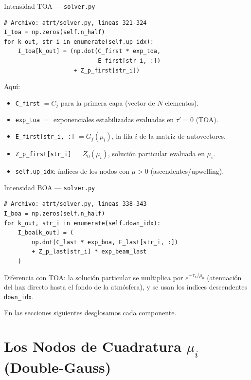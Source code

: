 \documentclass[a4paper,11pt]{article}
\begin{document}
\begin{implementation}{Intensidad TOA --- \texttt{solver.py}}
\begin{lstlisting}
# Archivo: atrt/solver.py, lineas 321-324
I_toa = np.zeros(self.n_half)
for k_out, str_i in enumerate(self.up_idx):
    I_toa[k_out] = (np.dot(C_first * exp_toa,
                           E_first[str_i, :])
                    + Z_p_first[str_i])
\end{lstlisting}
Aqu\'i:
\begin{itemize}
\item \texttt{C\_first} $= \widetilde{C}_j$ para la primera capa (vector de $N$ elementos).
\item \texttt{exp\_toa} $= $ exponenciales estabilizadas evaluadas en $\tau' = 0$ (TOA).
\item \texttt{E\_first[str\_i, :]} $= G_j(\mu_i)$, la fila $i$ de la matriz de autovectores.
\item \texttt{Z\_p\_first[str\_i]} $= Z_0(\mu_i)$, soluci\'on particular evaluada en $\mu_i$.
\item \texttt{self.up\_idx}: \'indices de los nodos con $\mu > 0$ (ascendentes/upwelling).
\end{itemize}
\end{implementation}

\begin{implementation}{Intensidad BOA --- \texttt{solver.py}}
\begin{lstlisting}
# Archivo: atrt/solver.py, lineas 338-343
I_boa = np.zeros(self.n_half)
for k_out, str_i in enumerate(self.down_idx):
    I_boa[k_out] = (
        np.dot(C_last * exp_boa, E_last[str_i, :])
        + Z_p_last[str_i] * exp_beam_last
    )
\end{lstlisting}
Diferencia con TOA: la soluci\'on particular se multiplica por $e^{-\tau_L/\mu_0}$ (atenuaci\'on del haz directo hasta el fondo de la atm\'osfera), y se usan los \'indices descendentes \texttt{down\_idx}.
\end{implementation}

En las secciones siguientes desglosamos cada componente.

\section{Los Nodos de Cuadratura $\mu_i$ (Double-Gauss)}
\label{sec:quadrature}
\end{document}
